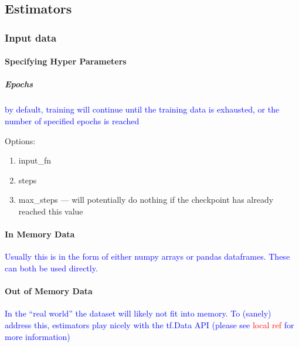 \subsection{Estimators}


\subsubsection{Input data}


\paragraph{Specifying Hyper Parameters}

\subparagraph{Epochs}
\textcolor{blue}{by default, training will continue until the training data is exhausted, or the number of specified epochs is reached}

Options:

\begin{enumerate}
	\item input\_fn
	\item steps
	\item max\_steps --- will potentially do nothing if the checkpoint has already reached this value
\end{enumerate}


\paragraph{In Memory Data}

\textcolor{blue}{Usually this is in the form of either numpy arrays or pandas dataframes. These can both be used directly.}



\paragraph{Out of Memory Data}

\textcolor{blue}{In the ``real world'' the dataset will likely not fit into memory. To (sanely) address this, estimators play nicely with the tf.Data API (please see \textcolor{red}{local ref} for more information)}

